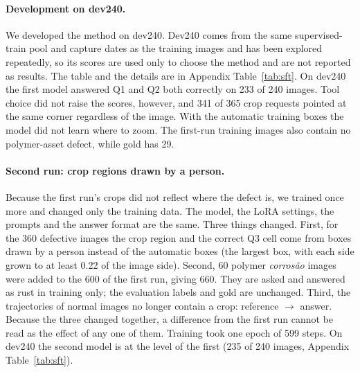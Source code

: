 \documentclass[11pt]{article}
\begin{document}
\paragraph{Development on dev240.} We developed the method on dev240. Dev240 comes from the same supervised-train pool and capture dates as the training images and has been explored repeatedly, so its scores are used only to choose the method and are not reported as results. The table and the details are in Appendix Table~\ref{tab:sft}. On dev240 the first model answered Q1 and Q2 both correctly on 233 of 240 images. Tool choice did not raise the scores, however, and 341 of 365 crop requests pointed at the same corner regardless of the image. With the automatic training boxes the model did not learn where to zoom. The first-run training images also contain no polymer-asset defect, while gold has 29.

\paragraph{Second run: crop regions drawn by a person.} Because the first run's crops did not reflect where the defect is, we trained once more and changed only the training data. The model, the LoRA settings, the prompts and the answer format are the same. Three things changed. First, for the 360 defective images the crop region and the correct Q3 cell come from boxes drawn by a person instead of the automatic boxes (the largest box, with each side grown to at least 0.22 of the image side). Second, 60 polymer \emph{corrosão} images were added to the 600 of the first run, giving 660. They are asked and answered as rust in training only; the evaluation labels and gold are unchanged. Third, the trajectories of normal images no longer contain a crop: reference $\rightarrow$ answer. Because the three changed together, a difference from the first run cannot be read as the effect of any one of them. Training took one epoch of 599 steps. On dev240 the second model is at the level of the first (235 of 240 images, Appendix Table~\ref{tab:sft}).
\end{document}
